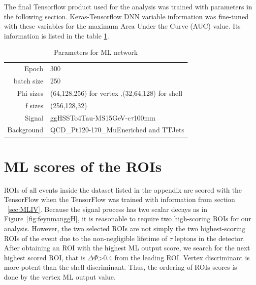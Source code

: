 The final Tensorflow product used for the analysis was trained with parameters in the following section.
Keras-Tensorflow DNN variable information was fine-tuned with these variables for the maximum Area Under the Curve (AUC) value.
Its information is listed in the table \ref{tab:ROIParam}.
\begin{table}[htb]
\caption{Parameters for ML network}
\begin{center}
\begin{tabular}{r|l}\hline
Epoch & 300 \\
batch size & 250 \\
Phi sizes & (64,128,256) for vertex ,(32,64,128) for shell \\
f sizes & (256,128,32) \\
Signal & ggHSSTo4Tau-MS15GeV-c$\tau$100mm  \\
Background & QCD\_Pt120-170\_MuEneriched and TTJets \\
 \hline
 \hline
\end{tabular}
\label{tab:ROIParam}
\end{center}
\end{table}


\section{ML scores of the ROIs}
ROIs of all events inside the dataset listed in the appendix are scored with the TensorFlow when the TensorFlow was trained with information from section ~\ref{sec:MLIV}.
Because the signal process has two scalar decays as in Figure~\ref{fig:feynmanggH}, it is reasonable to require two high-scoring ROIs for our analysis.
However, the two selected ROIs are not simply the two highest-scoring ROIs of the event due to the non-negligible lifetime of $\tau$ leptons in the detector.
After obtaining an ROI with the highest ML output score, we search for the next highest scored ROI, that is $\Delta\Phi$>0.4 from the leading ROI.
Vertex discriminant is more potent than the shell discriminant.
Thus, the ordering of ROIs scores is done by the vertex ML output value.

